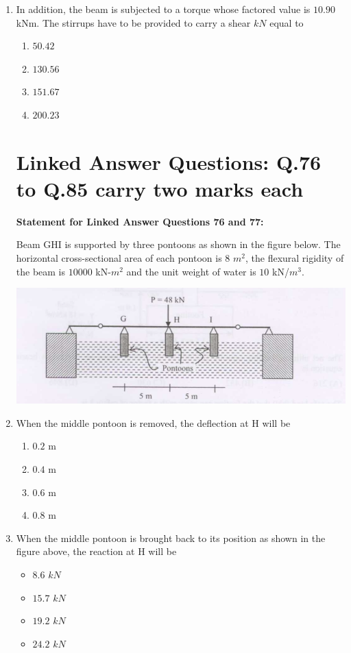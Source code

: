 \documentclass[journal]{IEEEtran}
\begin{document}
\begin{enumerate}
\vspace{0.5cm}

\item  In addition, the beam is subjected to a torque whose factored value is $10.90$ kNm. The stirrups have to be provided to carry a shear $kN$ equal to \hfill {}
\begin{enumerate}
\item $50.42$
\item $130.56$
\item $151.67$
\item $200.23$
\end{enumerate}

\section*{Linked Answer Questions: Q.76 to Q.85 carry two marks each}

\textbf{Statement for Linked Answer Questions 76 and 77:}

Beam GHI is supported by three pontoons as shown in the figure below. The horizontal cross-sectional area of each pontoon is $8$ $m^{2}$, the flexural rigidity of the beam is $10000$ kN-$m^{2}$ and the unit weight of water is $10$ kN/$m^{3}$.

\vspace{0.3cm}
\includegraphics[width=0.6\columnwidth]{figs/fig9.png} 
\vspace{0.3cm}

\item \hspace{0.2cm} When the middle pontoon is removed, the deflection at H will be \hfill {}
\begin{enumerate}
\item $0.2$ m
\item $0.4$ m
\item $0.6$ m
\item $0.8$ m
\end{enumerate}

\item \hspace{0.2cm} When the middle pontoon is brought back to its position as shown in the figure above, the reaction at H will be \hfill {}
\begin{itemize}
\item $8.6$ $kN$
\item $15.7$ $kN$
\item $19.2$ $kN$
\item $24.2$ $kN$
\end{itemize}


\end{enumerate}
\end{document}
